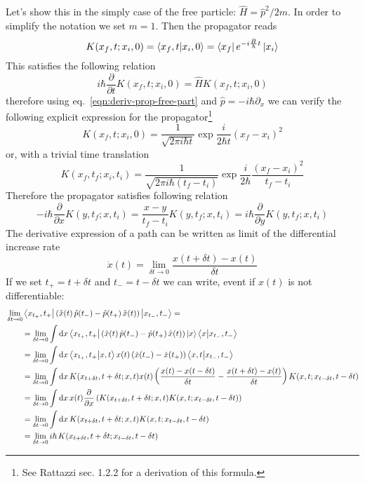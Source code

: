 \documentclass[../main/main.tex]{subfiles}
\begin{document}
Let's show this in the simply case of the free particle: $\hat H=\hat p^2/2m$. In order to simplify the notation we set $m=1$. Then the propagator reads
\[K(x_f,t;x_i,0)=\braket{x_f,t}{x_i,0}=\bra{x_f}e^{-i\frac{\hat H}{\hbar}t}\ket{x_i}\]
This satisfies the following relation
\begin{equation}\label{eqn:deriv-prop-free-part}
i\hbar\frac{\partial}{\partial t}K(x_f,t;x_i,0)=\hat HK(x_f,t;x_i,0)
\end{equation}
therefore using eq.~\eqref{eqn:deriv-prop-free-part} and $\hat p=-i\hbar\partial_x$ we can verify the following explicit expression for the propagator\footnote{See \textsf{Rattazzi sec. 1.2.2} for a derivation of this formula.}
\[K(x_f,t;x_i,0)=\frac1{\sqrt{2\pi i\hbar t}}\exp{\frac{i}{2\hbar t}(x_f-x_i)^2}\]
or, with a trivial time translation
\[K(x_f,t_f;x_i,t_i)=\frac 1{\sqrt{2\pi i\hbar (t_f-t_i)}}\exp{\frac{i}{2\hbar}\frac{(x_f-x_i)^2}{t_f-t_i}}\]
Therefore the propagator satisfies following relation
\begin{equation}\label{eqn:derivx-propag-free-part}
-i\hbar \frac{\partial}{\partial x}K(y,t_f;x,t_i)= \frac{x-y}{t_f-t_i}K(y,t_f;x,t_i)=i\hbar \frac{\partial}{\partial y}K(y,t_f;x,t_i)
\end{equation}
The derivative expression of a path can be written as limit of the differential increase rate
\[\dot x(t)=\lim_{\delta t\to0}\frac{x(t+\delta t)-x(t)}{\delta t}\]
If we set $t_+=t+\delta t$ and $t_-=t-\delta t$ we can write, event if $x(t)$ is not differentiable:
\begin{align*}
&\lim_{\delta t\to0}\bra{x_{t_+},{t_+}}\left(\hat x(t)\,\hat p(t_-)-\hat p(t_+)\,\hat x(t)\right)\ket{x_{t_-},{t_-}}=\\
&\qquad=\lim_{\delta t\to0}\int\textup{d} x\bra{x_{t_+},{t_+}}\left(\hat x(t)\,\hat p(t_-)-\hat p(t_+)\,\hat x(t)\right)\ket x\bra x\ket{x_{t_-},t_-}\\
&\qquad=\lim_{\delta t\to0}\int\textup{d} x\braket{x_{t_+},{t_+}}{x,t}x(t)\left(\dot x(t_-)-\dot x(t_+)\right)\bra{ x,t}\ket{x_{t_-},t_-}\\
&\qquad=\lim_{\delta t\to0}\int\textup{d} x\,K(x_{t+\delta t},t+\delta t;x,t)x(t)\left(\frac{x(t)-x(t-\delta t)}{\delta t}-\frac{x(t+\delta t)-x(t)}{\delta t}\right)K(x,t;x_{t-\delta t},t-\delta t)\\
&\qquad=\lim_{\delta t\to0} \int\textup{d} x\,x(t)\frac\partial{\partial x}\left(K(x_{t+\delta t},t+\delta t;x,t)K(x,t;x_{t-\delta t},t-\delta t)\right)\\
&\qquad=\lim_{\delta t\to0} \int\textup{d} x\,K(x_{t+\delta t},t+\delta t;x,t)K(x,t;x_{t-\delta t},t-\delta t)\\
&\qquad=\lim_{\delta t\to0} i\hbar \,K(x_{t+\delta t},t+\delta t;x_{t-\delta t},t-\delta t)
\end{align*}
\end{document}
